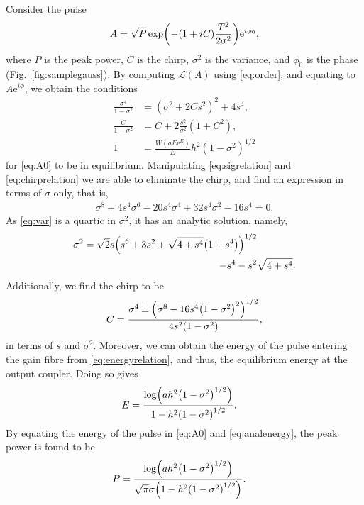 \documentclass[9pt,twocolumn,twoside]{osajnl}
\let\originalleft\left
\let\originalright\right
\renewcommand{\left}{\mathopen{}\mathclose\bgroup\originalleft}
\renewcommand{\right}{\aftergroup\egroup\originalright}
\begin{document}
Consider the pulse
\begin{align}
	A = \sqrt{P} \exp \left( -(1 + iC) \frac{T^2}{2 \sigma^2} \right) \textrm{e}^{i \phi_0},
	\label{eq:A0}
\end{align}
where $P$ is the peak power, $C$ is the chirp, $\sigma^2$ is the variance, and $\phi_0$ is the phase (Fig.~\ref{fig:samplegauss}). By computing $\mathcal{L}(A)$ using \eqref{eq:order}, and equating to $A \textrm{e}^{i \phi}$, we obtain the conditions
\begin{align}
	\frac{\sigma^4}{1 - \sigma^2} &= (\sigma^2 + 2 C s^2)^2 + 4 s^4, \label{eq:sigrelation} \\
	\frac{C}{1 - \sigma^2} &= C + 2 \frac{s^2}{\sigma^2} (1 + C^2), \label{eq:chirprelation} \\
	1 &= \frac{W(a E \textrm{e}^E)}{E} h^2 (1 - \sigma^2)^{1/2} \label{eq:energyrelation}
\end{align}
for \eqref{eq:A0} to be in equilibrium. Manipulating \eqref{eq:sigrelation} and \eqref{eq:chirprelation} we are able to eliminate the chirp, and find an expression in terms of $\sigma$ only, that is,
\begin{align}
	\sigma^8 + 4 s^4 \sigma^6 - 20 s^4 \sigma^4 + 32 s^4 \sigma^2 - 16 s^4 = 0. \label{eq:var}
\end{align}
As \eqref{eq:var} is a quartic in $\sigma^2$, it has an analytic solution, namely,
\begin{equation}
	\begin{split}
		\sigma^2 = \sqrt{2} s \left( s^6 + 3s^2 + \sqrt{4 + s^4} \left( 1 + s^4 \right) \right)^{1/2} & \\
		- s^4 - s^2 & \sqrt{4 + s^4}.
		\label{eq:equilvar}
	\end{split}
\end{equation}
Additionally, we find the chirp to be
\begin{align}
	C = \frac{\sigma^4 \pm \left( \sigma^8 - 16 s^4 \left( 1 - \sigma^2 \right)^2 \right)^{1/2}}{4 s^2 \left( 1 - \sigma^2 \right)},
	\label{eq:chirp}
\end{align}
in terms of $s$ and $\sigma^2$. Moreover, we can obtain the energy of the pulse entering the gain fibre from \eqref{eq:energyrelation}, and thus, the equilibrium energy at the output coupler. Doing so gives
\begin{align}
	E &= \frac{\log \left( a h^2 \left( 1 - \sigma^2 \right)^{1/2} \right)}{1 - h^2 \left( 1 - \sigma^2 \right)^{1/2}}.
	\label{eq:analenergy}
\end{align}
By equating the energy of the pulse in \eqref{eq:A0} and \eqref{eq:analenergy}, the peak power is found to be
\begin{align}
	P &= \frac{\log \left( a h^2 \left( 1 - \sigma^2 \right)^{1/2} \right)}{\sqrt{\pi} \sigma \left( 1 - h^2 \left( 1 - \sigma^2 \right)^{1/2} \right)}.
	\label{eq:analpower}
\end{align}
\end{document}
